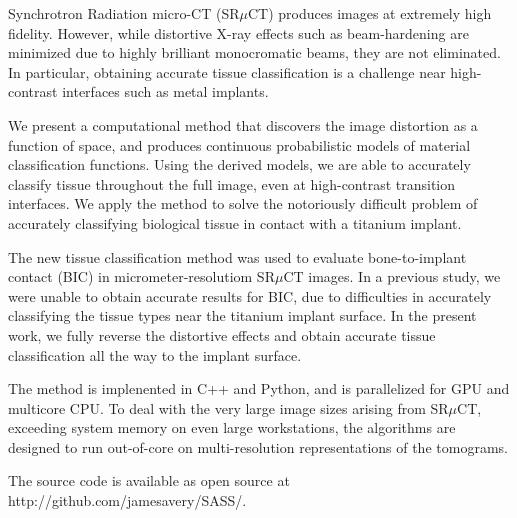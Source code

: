 Synchrotron Radiation micro-CT (SR$\mu$CT) produces images at
extremely high fidelity.  However, while distortive X-ray effects such
as beam-hardening are minimized due to highly brilliant monocromatic
beams, they are not eliminated. In particular, obtaining accurate
tissue classification is a challenge near high-contrast interfaces
such as metal implants.

We present a computational method that discovers the image distortion as a function of space,
and produces continuous probabilistic models of material classification functions.
Using the derived models, we are able to accurately classify tissue throughout the full
image, even at high-contrast transition interfaces.
% 
We apply the method to solve the notoriously difficult problem of accurately classifying
biological tissue in contact with a titanium implant. 
  
The new tissue classification method was used to evaluate
bone-to-implant contact (BIC) in micrometer-resolutiom SR$\mu$CT images.
In a previous study, we were unable to obtain accurate
results for BIC, due to difficulties in accurately classifying the
tissue types near the titanium implant surface. In the present work,
we fully reverse the distortive effects and obtain accurate tissue classification
all the way to the implant surface.

The method is implenented in C++ and Python, and is parallelized for GPU and multicore CPU.
To deal with the very large image sizes arising from SR$\mu$CT, exceeding system
memory on even large workstations, the algorithms are designed to run
out-of-core on multi-resolution representations of the tomograms.

The source code is available as open source at http://github.com/jamesavery/SASS/.



